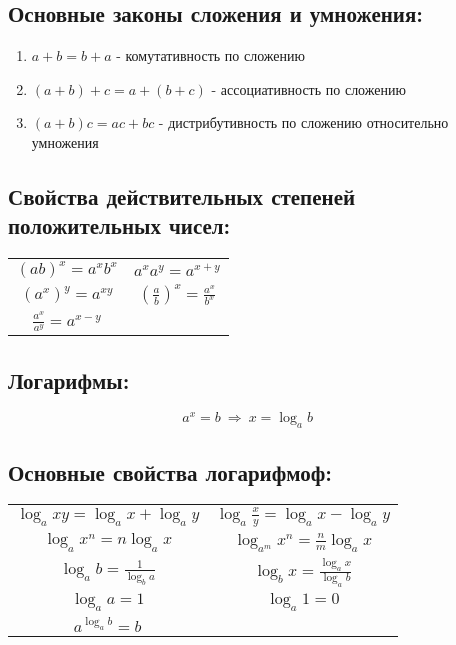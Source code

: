 \documentclass[12pt, a4paper]{article}
\begin{document}
\subsection{Основные законы сложения и умножения:}
\begin{enumerate}
	\item $a+b=b+a$ - комутативность по сложению
	\item $(a+b)+c=a+(b+c)$ - ассоциативность по сложению
	\item $(a+b)c=ac+bc$ - дистрибутивность по сложению относительно умножения
\end{enumerate}
\subsection{Свойства действительных степеней положительных чисел:}
\begin{center}
\begin{tabular}{cc}
	$\displaystyle \left( a b \right)^x = a^xb^x$ &
	$\displaystyle a^xa^y = a^{x+y}             $ \\ 
	$\displaystyle \left( a^x \right)^y = a^{xy}$ & 
	$\displaystyle \left( \frac{a}{b} \right)^x = \frac{a^x}{b^x}$ \\ 
	$\displaystyle \frac{a^x}{a^y} = a^{x-y}                     $ & \\
\end{tabular}
\end{center}
\subsection{Логарифмы:}
$$a^x=b \ \Rightarrow \  x = \log_ab \ \ \ \ \ \ \ \  $$
\subsection{Основные свойства логарифмоф:}
\begin{center}
\begin{tabular}{cc}
	$\displaystyle \log_axy = \log_ax+\log_ay$ & 
	$\displaystyle \log_a \frac{x}{y} = \log_ax-\log_ay$ \\
	$\displaystyle \log_ax^n = n\log_ax$ &
	$\displaystyle \log_{a^m}x^n = \frac{n}{m}\log_ax$ \\
	$\displaystyle \log_ab = \frac{1}{\log_ba}$ &
	$\displaystyle \log_bx = \frac{\log_ax}{\log_ab}$ \\
	$\log_aa=1$ & $\log_a1=0$ \\ $\displaystyle a^{\log_ab}=b$ & \\
\end{tabular}
\end{center}
\newpage
\end{document}
